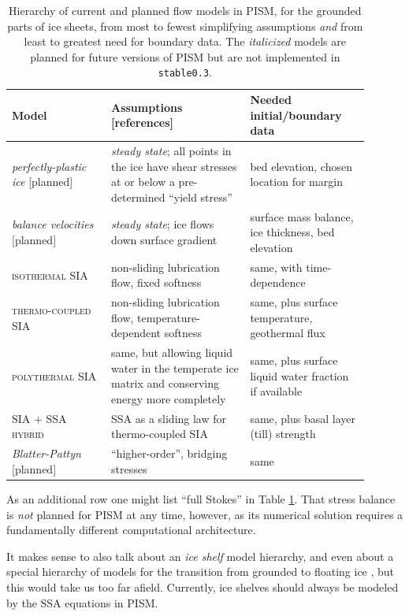 \documentclass[titlepage,letterpaper,final]{scrartcl}
\begin{document}
\begin{table}[ht]
\caption{Hierarchy of current and planned flow models in PISM, for the grounded parts of ice sheets, from most to fewest simplifying assumptions \emph{and} from least to greatest need for boundary data.  The \emph{italicized} models are planned for future versions of PISM but are not implemented in \texttt{stable0.3}.}\label{tab:modelhierarchy} 
\small
\begin{tabular}{p{0.25\linewidth}p{0.35\linewidth}p{0.3\linewidth}}\hline
\textbf{Model} & \textbf{Assumptions [references]} & \textbf{Needed initial/boundary data} \\ \hline
\emph{perfectly-plastic ice} \tiny[planned]\small & \emph{steady state}; all points in the ice have shear stresses at or below a pre-determined ``yield stress'' & bed elevation, chosen location for margin \\
\emph{balance velocities} \tiny[planned]\small & \emph{steady state}; ice flows down surface gradient \cite{JoughinetalGrBal97} & surface mass balance, ice  thickness, bed elevation \\
\textsc{isothermal SIA} & non-sliding lubrication flow, fixed softness \cite{BLKCB,EISMINT96} & same, with time-dependence \\
\textsc{thermo-coupled SIA} & non-sliding lubrication flow, temperature-dependent softness \cite{BBL,EISMINT00} & same, plus surface temperature,  geothermal flux \\
\textsc{polythermal SIA} & same, but allowing liquid water in the temperate ice matrix and conserving energy more completely \cite{AschwandenBlatter,Greve} & same, plus surface liquid water fraction if available \\
\textsc{SIA + SSA hybrid} & SSA as a sliding law for thermo-coupled SIA \cite{BBssasliding} & same, plus basal layer (till) strength \\
\emph{Blatter-Pattyn} \tiny[planned]\small & ``higher-order'', bridging stresses \cite{Blatter,Pattyn03,SchoofCoulombBlatter} & same \\ \hline
\end{tabular}
\normalsize
\end{table}

As an additional row one might list ``full Stokes'' in Table \ref{tab:modelhierarchy}.  That stress balance is \emph{not} planned for PISM at any time, however, as its numerical solution requires a fundamentally different computational architecture.

It makes sense to also talk about an \emph{ice shelf} model hierarchy, and even about a special hierarchy of models for the transition from grounded to floating ice \cite{SchoofMarine1}, but this would take us too far afield.  Currently, ice shelves should always be modeled by the SSA equations in PISM.
\end{document}
